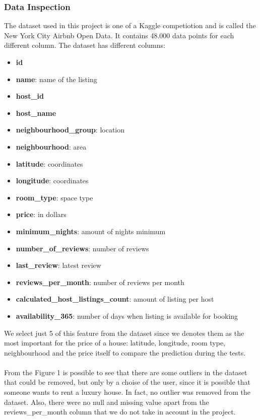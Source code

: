 \documentclass{FR16}
\begin{document}
\subsubsection{Data Inspection}
The dataset used in this project is one of a Kaggle competiotion and is called the New York City Airbnb Open Data. It contains 48.000 data points for each different column.
The dataset has different columns: 
\begin{itemize}
\itemsep0em 
\item \textbf{id}
\item \textbf{name}: name of the listing
\item \textbf{host\_id}
\item \textbf{host\_name}
\item \textbf{neighbourhood\_group}: location
\item \textbf{neighbourhood}: area
\item \textbf{latitude}: coordinates
\item \textbf{longitude}: coordinates
\item \textbf{room\_type}: space type
\item \textbf{price}:  in dollars
\item \textbf{minimum\_nights}: amount of nights minimum
\item \textbf{number\_of\_reviews}: number of reviews
\item \textbf{last\_review}: latest review
\item \textbf{reviews\_per\_month}: number of reviews per month
\item \textbf{calculated\_host\_listings\_count}: amount of listing per host
\item  \textbf{availability\_365}: number of days when listing is available for booking\\
\end{itemize}
We select just 5 of this feature from the dataset since we denotes them as the most important for the price of a house: latitude, longitude, room type, neighbourhood and the price itself to compare the prediction during the tests. \\\\
From the Figure 1 is possible to see that there are some outliers in the dataset that could be removed, but only by a choise of the user, since it is possible that someone wants to rent a luxury house. In fact, no outlier was removed from the dataset. Also, there were no null and missing value apart from the reviews\_per\_month column that we do not take in account in the project.
\end{document}
